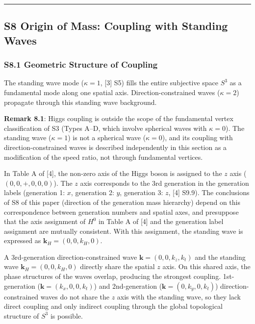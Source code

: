 \documentclass[
  a4paper,11pt]{article}
\theoremstyle{definition}
\theoremstyle{remark}
\begin{document}
\begin{center}\rule{0.5\linewidth}{0.5pt}\end{center}

\subsection{S8 Origin of Mass: Coupling with Standing
Waves}\label{s8-origin-of-mass-coupling-with-standing-waves}

\subsubsection{S8.1 Geometric Structure of
Coupling}\label{s8.1-geometric-structure-of-coupling}

The standing wave mode (\(\kappa = 1\), {[}3{]} S5) fills the entire
subjective space \(S^3\) as a fundamental mode along one spatial axis.
Direction-constrained waves (\(\kappa = 2\)) propagate through this
standing wave background.

\textbf{Remark 8.1}: Higgs coupling is outside the scope of the
fundamental vertex classification of S3 (Types A--D, which involve
spherical waves with \(\kappa = 0\)). The standing wave (\(\kappa = 1\))
is not a spherical wave (\(\kappa = 0\)), and its coupling with
direction-constrained waves is described independently in this section
as a modification of the speed ratio, not through fundamental vertices.

In Table A of {[}4{]}, the non-zero axis of the Higgs boson is assigned
to the \(z\) axis (\((0, 0, +, 0, 0, 0)\)). The \(z\) axis corresponds
to the 3rd generation in the generation labels (generation 1: \(x\),
generation 2: \(y\), generation 3: \(z\), {[}4{]} S9.9). The conclusions
of S8 of this paper (direction of the generation mass hierarchy) depend
on this correspondence between generation numbers and spatial axes, and
presuppose that the axis assignment of \(H^0\) in Table A of {[}4{]} and
the generation label assignment are mutually consistent. With this
assignment, the standing wave is expressed as
\(\mathbf{k}_H = (0, 0, k_H, 0)\).

A 3rd-generation direction-constrained wave
\(\mathbf{k} = (0, 0, k_z, k_t)\) and the standing wave
\(\mathbf{k}_H = (0, 0, k_H, 0)\) directly share the spatial \(z\) axis.
On this shared axis, the phase structures of the waves overlap,
producing the strongest coupling. 1st-generation
(\(\mathbf{k} = (k_x, 0, 0, k_t)\)) and 2nd-generation
(\(\mathbf{k} = (0, k_y, 0, k_t)\)) direction-constrained waves do not
share the \(z\) axis with the standing wave, so they lack direct
coupling and only indirect coupling through the global topological
structure of \(S^3\) is possible.
\end{document}

